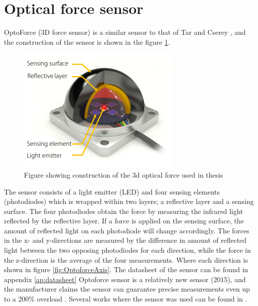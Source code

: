 \documentclass[USenglish]{ifimaster}  %
\begin{document}
\section{Optical force sensor}
OptoForce (3D force sensor) \cite{Optoforce} is a similar sensor to that of Tar and Cserey \cite{6027100}, and the construction of the sensor is shown in the figure \ref{fig:OptoforceBuild}. 

\begin{figure}[h]
	\centering
	\includegraphics[scale=0.8]{Figures/OptoforceBuild}
	\caption{Figure showing construction of the 3d optical force used in thesis \cite{OptoforceFig}}
	\label{fig:OptoforceBuild}
\end{figure}
\FloatBarrier

The sensor consists of a light emitter (LED) and four sensing elements (photodiodes) which is wrapped within two layers; a reflective layer and a sensing surface. The four photodiodes obtain the force by measuring the infrared light reflected by the reflective layer. If a force is applied on the sensing surface, the amount of reflected light on each photodiode will change accordingly. The forces in the x- and y-directions are measured by the difference in amount of reflected light between the two opposing photodiodes for each direction, while the force in the z-direction is the average of the four measurements. Where each direction is shown in figure \ref{fig:OptoforceAxis}. The datasheet of the sensor can be found in appendix \ref{ap:datasheet} Optoforce sensor is a relatively new sensor (2015), and the manufacturer claims the sensor can guarantee precise measurements even up to a 200\% overload \cite{Optoforce2}. Several works where the sensor was used can be found in \cite{7803326,7759112,7849467}.
\end{document}
